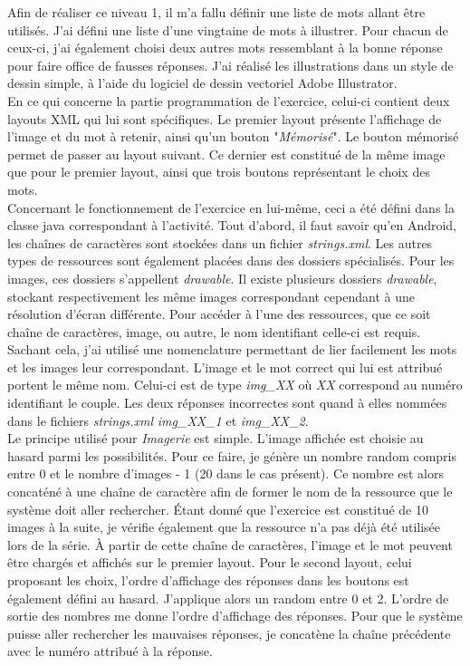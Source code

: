 Afin de réaliser ce niveau 1, il m'a fallu définir une liste de mots allant être utilisés. J'ai défini une liste d'une vingtaine de mots à illustrer. Pour chacun de ceux-ci, j'ai également choisi deux autres mots ressemblant à la bonne réponse pour faire office de fausses réponses. J'ai réalisé les illustrations dans un style de dessin simple, à l'aide du logiciel de dessin vectoriel Adobe Illustrator. \\


En ce qui concerne la partie programmation de l'exercice, celui-ci contient deux layouts XML qui lui sont spécifiques. Le premier layout présente l'affichage de l'image et du mot à retenir, ainsi qu'un bouton "\textit{Mémorisé}". Le bouton mémorisé permet de passer au layout suivant. Ce dernier est constitué de la même image que pour le premier layout, ainsi que trois boutons représentant le choix des mots.\\

Concernant le fonctionnement de l'exercice en lui-même, ceci a été défini dans la classe java correspondant à l'activité. Tout d'abord, il faut savoir qu'en Android, les chaînes de caractères sont stockées dans un fichier \textit{strings.xml}. Les autres types de ressources sont également placées dans des dossiers spécialisés. Pour les images, ces dossiers s'appellent \textit{drawable}. Il existe plusieurs dossiers \textit{drawable}, stockant respectivement les même images correspondant cependant à une résolution d'écran différente. Pour accéder à l'une des ressources, que ce soit chaîne de caractères, image, ou autre, le nom identifiant celle-ci est requis. Sachant cela, j'ai utilisé une nomenclature permettant de lier facilement les mots et les images leur correspondant. L'image et le mot correct qui lui est attribué portent le même nom. Celui-ci est de type \textit{img\_XX} où \textit{XX} correspond au numéro identifiant le couple. Les deux réponses incorrectes sont quand à elles nommées dans le fichiers \textit{strings.xml} \textit{img\_XX\_1} et \textit{img\_XX\_2}.\\

Le principe utilisé pour \textit{Imagerie} est simple. L'image affichée est choisie au hasard parmi les possibilités. Pour ce faire, je génère un nombre random compris entre 0 et le nombre d'images - 1 (20 dans le cas présent). Ce nombre est alors concaténé à une chaîne de caractère afin de former le nom de la ressource que le système doit aller rechercher. Étant donné que l'exercice est constitué de 10 images à la suite, je vérifie également que la ressource n'a pas déjà été utilisée lors de la série. À partir de cette chaîne de caractères, l'image et le mot peuvent être chargés et affichés sur le premier layout. Pour le second layout, celui proposant les choix, l'ordre d'affichage des réponses dans les boutons est également défini au hasard. J'applique alors un random entre 0 et 2. L'ordre de sortie des nombres me donne l'ordre d'affichage des réponses. Pour que le système puisse aller rechercher les mauvaises réponses, je concatène la chaîne précédente avec le numéro attribué à la réponse.\\

